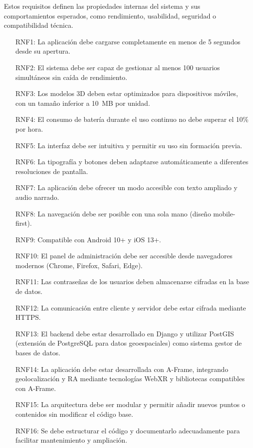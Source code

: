 Estos requisitos definen las propiedades internas del sistema y sus comportamientos esperados, como rendimiento, usabilidad, seguridad o compatibilidad técnica.

\begin{itemize}
    \item[RNF1:] La aplicación debe cargarse completamente en menos de 5 segundos desde su apertura.
    \item[RNF2:] El sistema debe ser capaz de gestionar al menos 100 usuarios simultáneos sin caída de rendimiento.
    \item[RNF3:] Los modelos 3D deben estar optimizados para dispositivos móviles, con un tamaño inferior a 10~MB por unidad.
    \item[RNF4:] El consumo de batería durante el uso continuo no debe superar el 10\% por hora.
    \item[RNF5:] La interfaz debe ser intuitiva y permitir su uso sin formación previa.
    \item[RNF6:] La tipografía y botones deben adaptarse automáticamente a diferentes resoluciones de pantalla.
    \item[RNF7:] La aplicación debe ofrecer un modo accesible con texto ampliado y audio narrado.
    \item[RNF8:] La navegación debe ser posible con una sola mano (diseño mobile-first).
    \item[RNF9:] Compatible con Android 10+ y iOS 13+.
    \item[RNF10:] El panel de administración debe ser accesible desde navegadores modernos (Chrome, Firefox, Safari, Edge).
    \item[RNF11:] Las contraseñas de los usuarios deben almacenarse cifradas en la base de datos.
    \item[RNF12:] La comunicación entre cliente y servidor debe estar cifrada mediante HTTPS.
    \item[RNF13:] El backend debe estar desarrollado en Django y utilizar PostGIS (extensión de PostgreSQL para datos geoespaciales) como sistema gestor de bases de datos.
    \item[RNF14:] La aplicación debe estar desarrollada con A-Frame, integrando geolocalización y RA mediante tecnologías WebXR y bibliotecas compatibles con A-Frame.
    \item[RNF15:] La arquitectura debe ser modular y permitir añadir nuevos puntos o contenidos sin modificar el código base.
    \item[RNF16:] Se debe estructurar el código y documentarlo adecuadamente para facilitar mantenimiento y ampliación.
\end{itemize}


